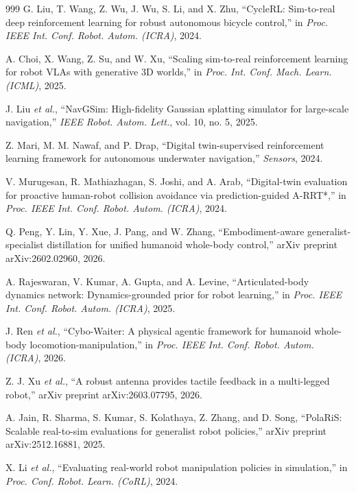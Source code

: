 \documentclass[12pt,a4paper,oneside]{report}
\begin{document}
\begin{thebibliography}{999}
G. Liu, T. Wang, Z. Wu, J. Wu, S. Li, and X. Zhu, ``{CycleRL}: Sim-to-real deep reinforcement learning for robust autonomous bicycle control,'' in \textit{Proc. IEEE Int. Conf. Robot. Autom. (ICRA)}, 2024.

A. Choi, X. Wang, Z. Su, and W. Xu, ``Scaling sim-to-real reinforcement learning for robot VLAs with generative 3D worlds,'' in \textit{Proc. Int. Conf. Mach. Learn. (ICML)}, 2025.

J. Liu \textit{et al.}, ``{NavGSim}: High-fidelity Gaussian splatting simulator for large-scale navigation,'' \textit{IEEE Robot. Autom. Lett.}, vol. 10, no. 5, 2025.

Z. Mari, M. M. Nawaf, and P. Drap, ``Digital twin-supervised reinforcement learning framework for autonomous underwater navigation,'' \textit{Sensors}, 2024.

V. Murugesan, R. Mathiazhagan, S. Joshi, and A. Arab, ``Digital-twin evaluation for proactive human-robot collision avoidance via prediction-guided A-RRT*,'' in \textit{Proc. IEEE Int. Conf. Robot. Autom. (ICRA)}, 2024.

Q. Peng, Y. Lin, Y. Xue, J. Pang, and W. Zhang, ``Embodiment-aware generalist-specialist distillation for unified humanoid whole-body control,'' arXiv preprint arXiv:2602.02960, 2026.

A. Rajeswaran, V. Kumar, A. Gupta, and A. Levine, ``Articulated-body dynamics network: Dynamics-grounded prior for robot learning,'' in \textit{Proc. IEEE Int. Conf. Robot. Autom. (ICRA)}, 2025.

J. Ren \textit{et al.}, ``Cybo-Waiter: A physical agentic framework for humanoid whole-body locomotion-manipulation,'' in \textit{Proc. IEEE Int. Conf. Robot. Autom. (ICRA)}, 2026.

Z. J. Xu \textit{et al.}, ``A robust antenna provides tactile feedback in a multi-legged robot,'' arXiv preprint arXiv:2603.07795, 2026.

A. Jain, R. Sharma, S. Kumar, S. Kolathaya, Z. Zhang, and D. Song, ``{PolaRiS}: Scalable real-to-sim evaluations for generalist robot policies,'' arXiv preprint arXiv:2512.16881, 2025.

X. Li \textit{et al.}, ``Evaluating real-world robot manipulation policies in simulation,'' in \textit{Proc. Conf. Robot. Learn. (CoRL)}, 2024.


\end{thebibliography}
\end{document}

